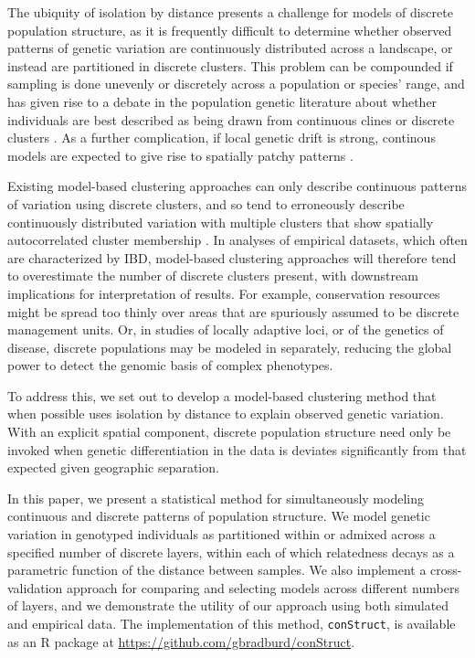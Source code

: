 \documentclass[12pt]{article}
\begin{document}
The ubiquity of isolation by distance presents a challenge for models of discrete population structure,
as it is frequently difficult to determine whether observed patterns of genetic variation are 
continuously distributed across a landscape, or instead are partitioned in discrete clusters.
This problem can be compounded if sampling is done unevenly or discretely across a population or species' range,
and has given rise to a debate in the population genetic literature about whether 
individuals are best described as being drawn from continuous clines or discrete clusters 
\citep[e.g.][]{SerrePaabo2004,rosenberg2005clines}.
As a further complication, if local genetic drift is strong,
continous models are expected to give rise to spatially patchy patterns
\citep{SLFV,bramson1989crabgrass}.

Existing model-based clustering approaches can only describe continuous patterns of variation using
discrete clusters, 
and so tend to erroneously describe continuously distributed variation with multiple clusters that 
show spatially autocorrelated cluster membership \citep{Frantz2009,meirmans2012}.
In analyses of empirical datasets, which often are characterized by IBD,
model-based clustering approaches will therefore tend to overestimate the number of discrete clusters present,
with downstream implications for interpretation of results.
For example, conservation resources might be spread too thinly over areas 
that are spuriously assumed to be discrete management units.
Or, in studies of locally adaptive loci, or of the genetics of disease,
discrete populations may be modeled in separately,
reducing the global power to detect the genomic basis of complex phenotypes.

To address this, we set out to develop
a model-based clustering method that when possible uses isolation by distance 
to explain observed genetic variation.
With an explicit spatial component, discrete population structure need only be invoked when genetic differentiation 
in the data is deviates significantly from that expected given geographic separation.

In this paper, we present a statistical method for simultaneously 
modeling continuous and discrete patterns of population structure.
We model genetic variation in genotyped individuals as 
partitioned within or admixed across a specified number of discrete layers,
within each of which relatedness decays as a parametric function of the distance between samples.
We also implement a cross-validation approach for comparing and selecting models across different numbers of layers,
and we demonstrate the utility of our approach using both simulated and empirical data.
The implementation of this method, \texttt{conStruct}, is available as an R package at 
\href{https://github.com/gbradburd/conStruct}{https://github.com/gbradburd/conStruct}.
\end{document}
